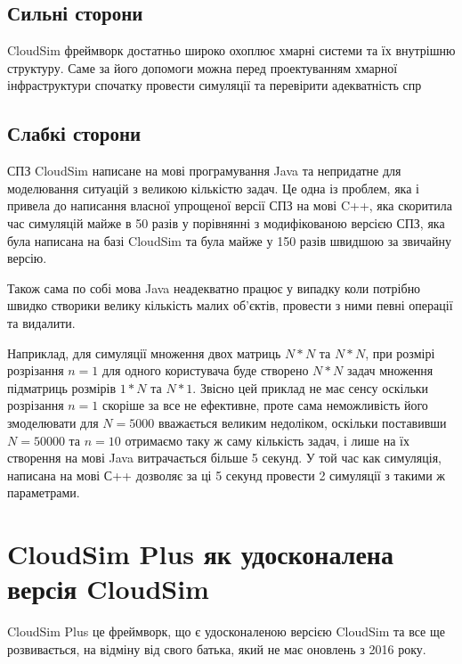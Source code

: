 \subsection{Сильні сторони}

CloudSim фреймворк \cite{CloudSim} достатньо широко охоплює хмарні системи та їх внутрішню структуру. Саме за його допомоги можна перед проектуванням хмарної інфраструктури спочатку провести симуляції та перевірити адекватність спр

\subsection{Слабкі сторони}

СПЗ CloudSim написане на мові програмування Java та непридатне для моделювання ситуацій з великою кількістю задач. Це одна із проблем, яка і привела до написання власної упрощеної версії СПЗ на мові C++, яка скоритила час симуляцій майже в 50 разів у порівнянні з модифікованою версією СПЗ, яка була написана на базі CloudSim та була майже у 150 разів швидшою за звичайну версію.

Також сама по собі мова Java неадекватно працює у випадку коли потрібно швидко створики велику кількість малих об'єктів, провести з ними певні операції та видалити.

Наприклад, для симуляції множення двох матриць $N*N$ та $N*N$, при розмірі розрізання $n=1$ для одного користувача буде створено $N*N$ задач множення підматриць розмірів $1*N$ та $N*1$. Звісно цей приклад не має сенсу оскільки розрізання $n=1$ скоріше за все не ефективне, проте сама неможливість його змоделювати для $N=5000$ вважається великим недоліком, оскільки поставивши $N=50000$ та $n=10$ отримаємо таку ж саму кількість задач, і лише на їх створення на мові Java витрачається більше 5 секунд. У той час как симуляція, написана на мові С++ дозволяє за ці 5 секунд провести 2 симуляції з такими ж параметрами.

\section{CloudSim Plus як удосконалена версія CloudSim}

CloudSim Plus \cite{CloudSimPlus} це фреймворк, що є удосконаленою версією CloudSim та все ще розвивається, на відміну від свого батька, який не має оновлень з 2016 року.